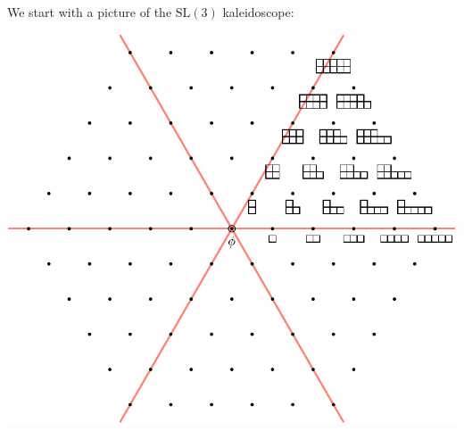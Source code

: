 \documentclass[11pt,oneside]{article}
\newcommand{\SL}{\mathrm{SL}}
\begin{document}
We start with a picture of the $\SL(3)$ kaleidoscope:
\begin{center}
\includegraphics[scale=0.8]{images/sl3.pdf}
\end{center}
\end{document}
